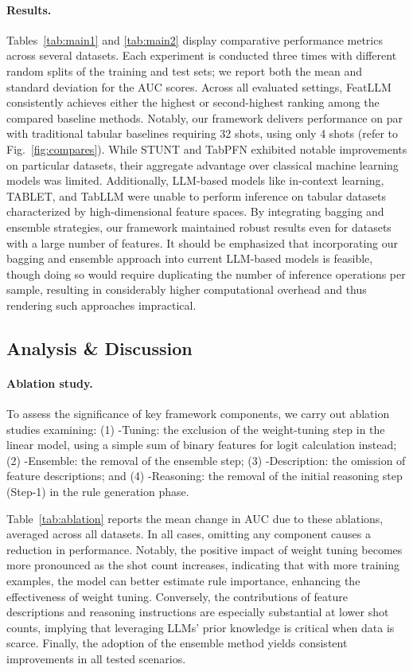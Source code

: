 \vspace*{-0.12in}
\paragraph{Results.}
Tables~\ref{tab:main1} and \ref{tab:main2} display comparative performance metrics across several datasets. Each experiment is conducted three times with different random splits of the training and test sets; we report both the mean and standard deviation for the AUC scores. Across all evaluated settings, \textsf{FeatLLM} consistently achieves either the highest or second-highest ranking among the compared baseline methods. Notably, our framework delivers performance on par with traditional tabular baselines requiring 32 shots, using only 4 shots (refer to Fig.~\ref{fig:compares}). While STUNT and TabPFN exhibited notable improvements on particular datasets, their aggregate advantage over classical machine learning models was limited. Additionally, LLM-based models like in-context learning, TABLET, and TabLLM were unable to perform inference on tabular datasets characterized by high-dimensional feature spaces. By integrating bagging and ensemble strategies, our framework maintained robust results even for datasets with a large number of features. It should be emphasized that incorporating our bagging and ensemble approach into current LLM-based models is feasible, though doing so would require duplicating the number of inference operations per sample, resulting in considerably higher computational overhead and thus rendering such approaches impractical.

\subsection{Analysis \& Discussion}
\label{sec:analysis}
\paragraph{Ablation study.} To assess the significance of key framework components, we carry out ablation studies examining: (1) \textsf{-Tuning}: the exclusion of the weight-tuning step in the linear model, using a simple sum of binary features for logit calculation instead; (2) \textsf{-Ensemble}: the removal of the ensemble step; (3) \textsf{-Description}: the omission of feature descriptions; and (4) \textsf{-Reasoning}: the removal of the initial reasoning step (Step-1) in the rule generation phase.

Table~\ref{tab:ablation} reports the mean change in AUC due to these ablations, averaged across all datasets. In all cases, omitting any component causes a reduction in performance. Notably, the positive impact of weight tuning becomes more pronounced as the shot count increases, indicating that with more training examples, the model can better estimate rule importance, enhancing the effectiveness of weight tuning. Conversely, the contributions of feature descriptions and reasoning instructions are especially substantial at lower shot counts, implying that leveraging LLMs' prior knowledge is critical when data is scarce. Finally, the adoption of the ensemble method yields consistent improvements in all tested scenarios.


